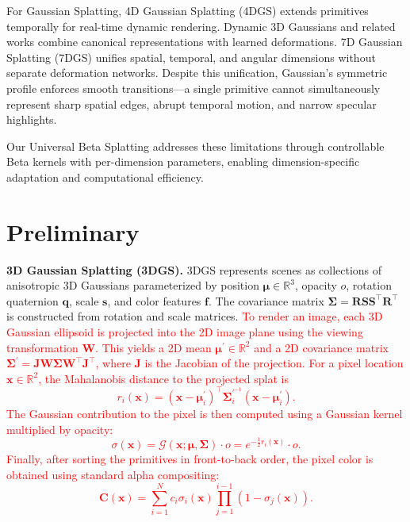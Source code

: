 \documentclass{article} %
\begin{document}
For Gaussian Splatting, 4D Gaussian Splatting (4DGS) \citep{yang2023real} extends primitives temporally for real-time dynamic rendering. Dynamic 3D Gaussians \citep{luiten2023dynamic} and related works \citep{wu20244d, yang2024deformable} combine canonical representations with learned deformations. 7D Gaussian Splatting (7DGS) \citep{gao20257dgs} unifies spatial, temporal, and angular dimensions without separate deformation networks. Despite this unification, Gaussian's symmetric profile enforces smooth transitions—a single primitive cannot simultaneously represent sharp spatial edges, abrupt temporal motion, and narrow specular highlights.

Our Universal Beta Splatting addresses these limitations through controllable Beta kernels with per-dimension parameters, enabling dimension-specific adaptation and computational efficiency.

\section{Preliminary}
\label{sec:preliminary}

\textbf{3D Gaussian Splatting (3DGS).}
3DGS \citep{3dgs} represents scenes as collections of anisotropic 3D Gaussians parameterized by position $\bm{\mu} \in \mathbb{R}^3$, opacity $o$, rotation quaternion $\bm{q}$, scale $\bm{s}$, and color features $\bm{f}$. The covariance matrix $\bm{\Sigma} = \bm{R}\bm{S}\bm{S}^\top\bm{R}^\top$ is constructed from rotation and scale matrices. 
\textcolor{red}{To render an image, each 3D Gaussian ellipsoid is projected into the 2D image plane using the viewing transformation $\bm{W}$. This yields a 2D mean $\bm{\mu}^\prime \in \mathbb{R}^2$ and a 2D covariance matrix $\bm{\Sigma}^\prime = \bm{JW\Sigma W^\top J^\top}$, where $\bm{J}$ is the Jacobian of the projection. For a pixel location $\bm{x} \in \mathbb{R}^2$, the Mahalanobis distance to the projected splat is
    \begin{equation}
        r_i(\bm{x}) = (\bm{x} - \bm{\mu}_i^\prime)^\top \bm{\Sigma}_i^{\prime^{-1}} (\bm{x} - \bm{\mu}_i^\prime).
    \end{equation}
    }
\textcolor{red}{The Gaussian contribution to the pixel is then computed using a Gaussian kernel multiplied by opacity:
 \begin{equation}
        \sigma(\bm{x}) = \mathcal{G}(\bm{x};\bm{\mu},\bm{\Sigma}) \cdot o=e^{-\frac{1}{2}r_i(\bm{x})} \cdot o.
    \end{equation}
}
\textcolor{red}{Finally, after sorting the primitives in front-to-back order, the pixel color is obtained using standard alpha compositing:
\begin{equation}
\bm{C}(\bm{x}) = \sum_{i=1}^N c_i \sigma_i(\bm{x}) \prod_{j=1}^{i-1}(1-\sigma_j(\bm{x})).
\end{equation}
}
\end{document}

